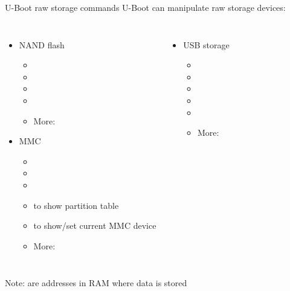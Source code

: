 \begin{frame}{U-Boot raw storage commands}
  U-Boot can manipulate raw storage devices:
  \begin{columns}
    \begin{itemize}
    \item NAND flash
      \begin{itemize}
      \item {}
      \item {}
      \item {}
      \item {}
      \item More: 
      \end{itemize}
    \item MMC
      \begin{itemize}
      \item {}
      \item {}
      \item {}
      \item {} to show partition table
      \item {} to show/set current MMC device
      \item More: 
      \end{itemize}
    \end{itemize}
    \vfill
    \begin{itemize}
    \item USB storage
      \begin{itemize}
      \item {}
      \item {}
      \item {}
      \item {}
      \item {}
      \item More: 
      \end{itemize}
    \end{itemize}
  \end{columns}
  \vspace{0.2cm}
  Note:  are addresses in RAM where data is stored
\end{frame}

